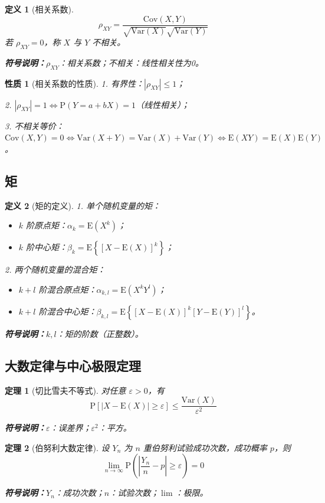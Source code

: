 \documentclass[11pt,a4paper,oneside]{article}
\theoremstyle{yhbthm}
\newtheorem{theorem}{定理}[section]
\newtheorem{definition}{定义}[section]
\newtheorem{property}{性质}[section]
\newcommand{\Cov}{\mathrm{Cov}}
\newcommand{\E}{\mathrm{E}}
\newcommand{\D}{\mathrm{Var}}
\newcommand{\Prob}{\mathrm{P}}
\newcommand{\symnote}[1]{\par\noindent\textbf{符号说明：}#1\par}
\begin{document}
\begin{definition}[相关系数]
$$
\rho_{XY} = \frac{\Cov(X,Y)}{\sqrt{\D(X)}\sqrt{\D(Y)}}
$$
若 $\rho_{XY}=0$，称 $X$ 与 $Y$ 不相关。
\symnote{$\rho_{XY}$：相关系数；不相关：线性相关性为0。}
\end{definition}

\begin{property}[相关系数的性质]
1. 有界性：$|\rho_{XY}| \le 1$；

2. $|\rho_{XY}| = 1 \iff \Prob(Y = a + bX) = 1$（线性相关）；

3. 不相关等价：$\Cov(X,Y)=0 \iff \D(X+Y)=\D(X)+\D(Y) \iff \E(XY)=\E(X)\E(Y)$。
\end{property}

\subsection{矩}
\begin{definition}[矩的定义]
1. 单个随机变量的矩：
\begin{itemize}
    \item $k$ 阶原点矩：$\alpha_k = \E(X^k)$；
    \item $k$ 阶中心矩：$\beta_k = \E\left\{[X-\E(X)]^k\right\}$；
\end{itemize}

2. 两个随机变量的混合矩：
\begin{itemize}
    \item $k+l$ 阶混合原点矩：$\alpha_{k,l} = \E(X^k Y^l)$；
    \item $k+l$ 阶混合中心矩：$\beta_{k,l} = \E\left\{[X-\E(X)]^k [Y-\E(Y)]^l\right\}$。
\end{itemize}
\symnote{$k,l$：矩的阶数（正整数）。}
\end{definition}

\subsection{大数定律与中心极限定理}
\begin{theorem}[切比雪夫不等式]
对任意 $\varepsilon > 0$，有
$$
\Prob\left[|X-\E(X)| \ge \varepsilon\right] \le \frac{\D(X)}{\varepsilon^2}
$$
\symnote{$\varepsilon$：误差界；$\varepsilon^2$：平方。}
\end{theorem}

\begin{theorem}[伯努利大数定律]
设 $Y_n$ 为 $n$ 重伯努利试验成功次数，成功概率 $p$，则
$$
\lim_{n \to \infty} \Prob\left(\left|\frac{Y_n}{n} - p\right| \ge \varepsilon\right) = 0
$$
\symnote{$Y_n$：成功次数；$n$：试验次数；$\lim$：极限。}
\end{theorem}
\end{document}

